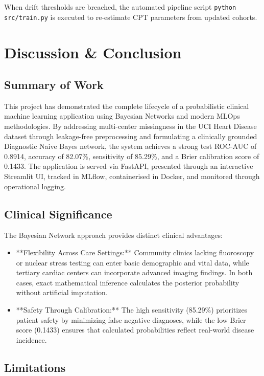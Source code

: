 \documentclass[12pt,a4paper]{report}
\begin{document}
When drift thresholds are breached, the automated pipeline script \texttt{python src/train.py} is executed to re-estimate CPT parameters from updated cohorts.

\chapter{Discussion \& Conclusion}

\section{Summary of Work}

This project has demonstrated the complete lifecycle of a probabilistic clinical machine learning application using Bayesian Networks and modern MLOps methodologies. By addressing multi-center missingness in the UCI Heart Disease dataset through leakage-free preprocessing and formulating a clinically grounded Diagnostic Naive Bayes network, the system achieves a strong test ROC-AUC of 0.8914, accuracy of 82.07\%, sensitivity of 85.29\%, and a Brier calibration score of 0.1433. The application is served via FastAPI, presented through an interactive Streamlit UI, tracked in MLflow, containerised in Docker, and monitored through operational logging.

\section{Clinical Significance}

The Bayesian Network approach provides distinct clinical advantages:
\begin{itemize}
\item **Flexibility Across Care Settings:** Community clinics lacking fluoroscopy or nuclear stress testing can enter basic demographic and vital data, while tertiary cardiac centers can incorporate advanced imaging findings. In both cases, exact mathematical inference calculates the posterior probability without artificial imputation.
\item **Safety Through Calibration:** The high sensitivity (85.29\%) prioritizes patient safety by minimizing false negative diagnoses, while the low Brier score (0.1433) ensures that calculated probabilities reflect real-world disease incidence.
\end{itemize}

\section{Limitations}
\end{document}
